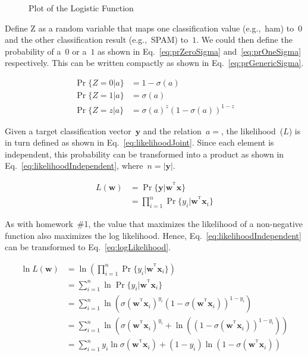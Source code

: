 \documentclass{report}
\newcommand{\xvec}{\mathbf{x}}
\newcommand{\y}{\mathbf{y}}
\newcommand{\w}{\mathbf{w}}
\newcommand{\T}{^\textrm{T}}
\newcommand{\wTx}{\w^{\T}\xvec}
\newcommand{\wTxi}{\w^{\T}\xvec_{i}}
\begin{document}
  \begin{figure}[tb]
    \centering
    \caption{Plot of the Logistic Function}\label{fig:sigmoidGraph}
  \end{figure}

  Define Z as a random variable that maps one classification value (e.g.,~ham) to~$0$ and the other classification result (e.g.,~SPAM) to~$1$.  We could then define the probability of a~$0$ or a~$1$ as shown in Eq.~\eqref{eq:prZeroSigma} and~\eqref{eq:prOneSigma} respectively.  This can be written compactly as shown in Eq.~\eqref{eq:prGenericSigma}.
  
  \begin{align}
    \Pr\{Z=0|a\}&=1-\sigma(a)\label{eq:prZeroSigma}\\
    \Pr\{Z=1|a\}&=\sigma(a)\label{eq:prOneSigma}\\
    \Pr\{Z=z|a\}&=\sigma(a)^{z}(1-\sigma(a))^{1-z}\label{eq:prGenericSigma}
  \end{align}
 
  \noindent
  Given a target classification vector~$\y$ and the relation~$a=$, the likelihood~($L$) is in turn defined as shown in Eq.~\eqref{eq:likelihoodJoint}.  Since each element is independent, this probability can be transformed into a product as shown in Eq.~\eqref{eq:likelihoodIndependent}, where~$n=|\y|$.
  
  \begin{align}
    L(\w)&=\Pr\{\y | \wTx \}\label{likelihoodJoint}\\
        &=\prod_{i=1}^{n}\Pr\{y_i | \wTxi \}\label{eq:likelihoodIndependent}
  \end{align}
 
  As with homework~\#1, the value that maximizes the likelihood of a non-negative function also maximizes the log likelihood.  Hence, Eq.~\eqref{eq:likelihoodIndependent} can be transformed to Eq.~\eqref{eq:logLikelihood}.
  
  \begin{align}
    \ln L(\w) &= \ln \left(\prod_{i=1}^{n}\Pr\{y_i | \wTxi\}\right)\\
             &= \sum_{i=1}^{n}\ln \Pr\{y_i | \wTxi\}\\
             &= \sum_{i=1}^{n}\ln \left( \sigma(\wTxi)^{y_i} (1-\sigma(\wTxi))^{1-y_i} \right)\\
             &= \sum_{i=1}^{n} \ln \left(\sigma(\wTxi)^{y_i}  + \ln \left( (1-\sigma(\wTxi))^{1-y_i} \right) \right)\\
             &= \sum_{i=1}^{n} y_i \ln \sigma(\wTxi) + (1-y_i) \ln (1-\sigma(\wTxi)) \label{eq:logLikelihood}
  \end{align}
 
\end{document}
